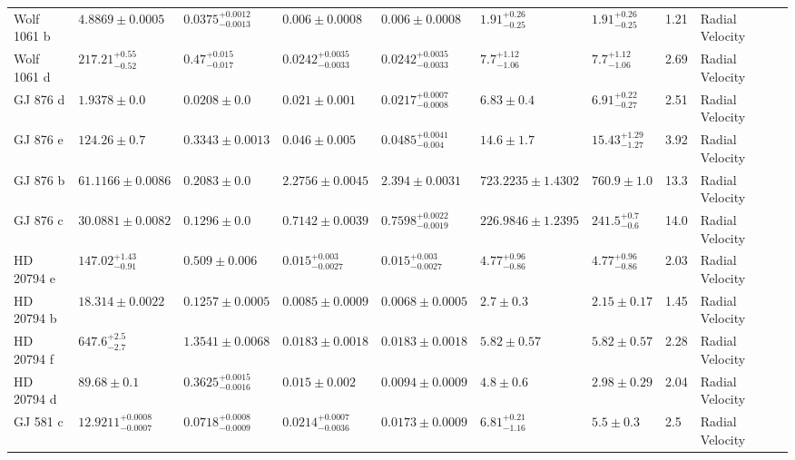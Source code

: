 \begin{tabular}{llllllllll}
Wolf 1061 b & $4.8869 \pm 0.0005$ & $0.0375^{+0.0012}_{-0.0013}$ & $0.006 \pm 0.0008$ & $0.006 \pm 0.0008$ & $1.91^{+0.26}_{-0.25}$ & $1.91^{+0.26}_{-0.25}$ & 1.21 & Radial Velocity & \cite{ASTUDILLO_DEFRU_ET_AL__2017} \\
Wolf 1061 d & $217.21^{+0.55}_{-0.52}$ & $0.47^{+0.015}_{-0.017}$ & $0.0242^{+0.0035}_{-0.0033}$ & $0.0242^{+0.0035}_{-0.0033}$ & $7.7^{+1.12}_{-1.06}$ & $7.7^{+1.12}_{-1.06}$ & 2.69 & Radial Velocity & \cite{ASTUDILLO_DEFRU_ET_AL__2017} \\
GJ 876 d & $1.9378 \pm 0.0$ & $0.0208 \pm 0.0$ & $0.021 \pm 0.001$ & $0.0217^{+0.0007}_{-0.0008}$ & $6.83 \pm 0.4$ & $6.91^{+0.22}_{-0.27}$ & 2.51 & Radial Velocity & \cite{RIVERA_ET_AL__2010} \\
GJ 876 e & $124.26 \pm 0.7$ & $0.3343 \pm 0.0013$ & $0.046 \pm 0.005$ & $0.0485^{+0.0041}_{-0.004}$ & $14.6 \pm 1.7$ & $15.43^{+1.29}_{-1.27}$ & 3.92 & Radial Velocity & \cite{RIVERA_ET_AL__2010} \\
GJ 876 b & $61.1166 \pm 0.0086$ & $0.2083 \pm 0.0$ & $2.2756 \pm 0.0045$ & $2.394 \pm 0.0031$ & $723.2235 \pm 1.4302$ & $760.9 \pm 1.0$ & 13.3 & Radial Velocity & \cite{RIVERA_ET_AL__2010} \\
GJ 876 c & $30.0881 \pm 0.0082$ & $0.1296 \pm 0.0$ & $0.7142 \pm 0.0039$ & $0.7598^{+0.0022}_{-0.0019}$ & $226.9846 \pm 1.2395$ & $241.5^{+0.7}_{-0.6}$ & 14.0 & Radial Velocity & \cite{RIVERA_ET_AL__2010} \\
HD 20794 e & $147.02^{+1.43}_{-0.91}$ & $0.509 \pm 0.006$ & $0.015^{+0.003}_{-0.0027}$ & $0.015^{+0.003}_{-0.0027}$ & $4.77^{+0.96}_{-0.86}$ & $4.77^{+0.96}_{-0.86}$ & 2.03 & Radial Velocity & \cite{FENG_ET_AL__2017} \\
HD 20794 b & $18.314 \pm 0.0022$ & $0.1257 \pm 0.0005$ & $0.0085 \pm 0.0009$ & $0.0068 \pm 0.0005$ & $2.7 \pm 0.3$ & $2.15 \pm 0.17$ & 1.45 & Radial Velocity & \cite{NARI_ET_AL_2025} \\
HD 20794 f & $647.6^{+2.5}_{-2.7}$ & $1.3541 \pm 0.0068$ & $0.0183 \pm 0.0018$ & $0.0183 \pm 0.0018$ & $5.82 \pm 0.57$ & $5.82 \pm 0.57$ & 2.28 & Radial Velocity & \cite{NARI_ET_AL_2025} \\
HD 20794 d & $89.68 \pm 0.1$ & $0.3625^{+0.0015}_{-0.0016}$ & $0.015 \pm 0.002$ & $0.0094 \pm 0.0009$ & $4.8 \pm 0.6$ & $2.98 \pm 0.29$ & 2.04 & Radial Velocity & \cite{NARI_ET_AL_2025} \\
GJ 581 c & $12.9211^{+0.0008}_{-0.0007}$ & $0.0718^{+0.0008}_{-0.0009}$ & $0.0214^{+0.0007}_{-0.0036}$ & $0.0173 \pm 0.0009$ & $6.81^{+0.21}_{-1.16}$ & $5.5 \pm 0.3$ & 2.5 & Radial Velocity & \cite{VON_STAUFFENBERG_ET_AL__2024} \\

\end{tabular}
